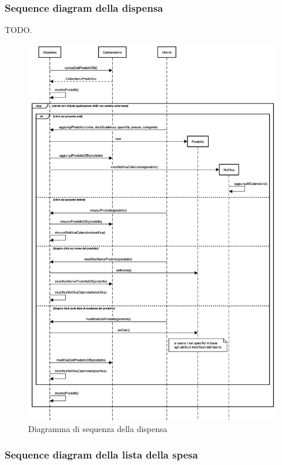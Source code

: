 \documentclass{article}
\begin{document}
\subsubsection{Sequence diagram della dispensa}

TODO.

\begin{figure}[H]
    \includegraphics[width=\linewidth]{images/sequence-pantry.png}
    \caption{Diagramma di sequenza della dispensa}
    \label{fig:seqpantry}
\end{figure}

\subsubsection{Sequence diagram della lista della spesa}
\end{document}
